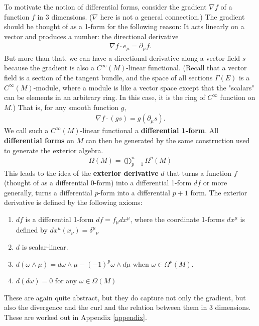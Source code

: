 \documentclass[aps,nofootinbib]{revtex4}
\begin{document}
To motivate the notion of differential forms, consider the gradient $\nabla f$ of a function $f$ in 3 dimensions. ($\nabla$ here is not a general connection.) The gradient should be thought of as a 1-form for the following reason: It acts linearly on a vector and produces a number: the directional derivative
\begin{align}
\nabla f \cdot e_{\mu} = \partial_{\mu} f.
\end{align}
But more than that, we can have a directional derivative along a vector field $s$ because the gradient is also a $C^{\infty}(M)$-linear functional. (Recall that a vector field is a section of the tangent bundle, and the space of all sections $\Gamma(E)$ is a $C^{\infty} (M)$-module, where a module is like a vector space except that the "scalars" can be elements in an arbitrary ring. In this case, it is the ring of $C^{\infty}$ function on $M$.) That is, for any smooth function $g$,
\begin{align}
\nabla f \cdot (g s) = g (\partial_{\mu} s).
\end{align}
We call such a $C^{\infty}(M)$-linear functional a {\bf differential 1-form}. All {\bf differential forms} on $M$ can then be generated by the same construction used to generate the exterior algebra.
\begin{align*}
\Omega (M) = \bigoplus_{p=1}^n \Omega^p (M)
\end{align*}   
This leads to the idea of the {\bf exterior derivative} $d$ that turns a function $f$ (thought of as a differential 0-form) into a differential 1-form $df$ or more generally, turns a differential $p$-form into a differential $p+1$ form. The exterior derivative is defined by the following axioms:
\begin{enumerate}
\item $df$ is a differential 1-form $df = f_{\mu} dx^{\mu}$, where the coordinate 1-forms $dx^{\mu}$ is defined by $dx^{\mu} (x_{\nu}) = \delta^{\mu}{}_{\nu}$
\item $d$ is scalar-linear.
\item $d(\omega \wedge \mu) = d\omega \wedge \mu - (-1)^{p} \omega \wedge d\mu $ when $\omega \in \Omega^p (M)$.
\item $d(d\omega) = 0$ for any $\omega \in \Omega(M)$
\end{enumerate}
These are again quite abstract, but they do capture not only the gradient, but also the divergence and the curl and the relation between them in 3 dimensions. These are worked out in Appendix \ref{appendix}. \\ \\
\end{document}
